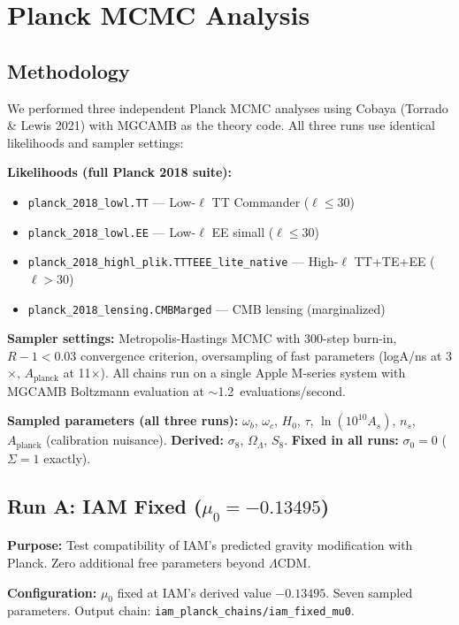 \documentclass[11pt,letterpaper]{article}
\begin{document}
\section{Planck MCMC Analysis}
\label{sec:planck_mcmc}

\subsection{Methodology}

We performed three independent Planck MCMC analyses using Cobaya (Torrado \& Lewis 2021) with MGCAMB as the theory code. All three runs use identical likelihoods and sampler settings:

\textbf{Likelihoods (full Planck 2018 suite):}
\begin{itemize}
\item \texttt{planck\_2018\_lowl.TT} --- Low-$\ell$ TT Commander ($\ell \leq 30$)
\item \texttt{planck\_2018\_lowl.EE} --- Low-$\ell$ EE simall ($\ell \leq 30$)
\item \texttt{planck\_2018\_highl\_plik.TTTEEE\_lite\_native} --- High-$\ell$ TT+TE+EE ($\ell > 30$)
\item \texttt{planck\_2018\_lensing.CMBMarged} --- CMB lensing (marginalized)
\end{itemize}

\textbf{Sampler settings:} Metropolis-Hastings MCMC with 300-step burn-in, $R-1 < 0.03$ convergence criterion, oversampling of fast parameters (logA/ns at 3$\times$, $A_\mathrm{planck}$ at 11$\times$). All chains run on a single Apple M-series system with MGCAMB Boltzmann evaluation at $\sim$1.2~evaluations/second.

\textbf{Sampled parameters (all three runs):} $\omega_b$, $\omega_c$, $H_0$, $\tau$, $\ln(10^{10}A_s)$, $n_s$, $A_\mathrm{planck}$ (calibration nuisance). \textbf{Derived:} $\sigma_8$, $\Omega_\Lambda$, $S_8$. \textbf{Fixed in all runs:} $\sigma_0 = 0$ ($\Sigma = 1$ exactly).

\subsection{Run A: IAM Fixed ($\mu_0 = -0.13495$)}

\textbf{Purpose:} Test compatibility of IAM's predicted gravity modification with Planck. Zero additional free parameters beyond $\Lambda$CDM.

\textbf{Configuration:} $\mu_0$ fixed at IAM's derived value $-0.13495$. Seven sampled parameters. Output chain: \texttt{iam\_planck\_chains/iam\_fixed\_mu0}.
\end{document}

